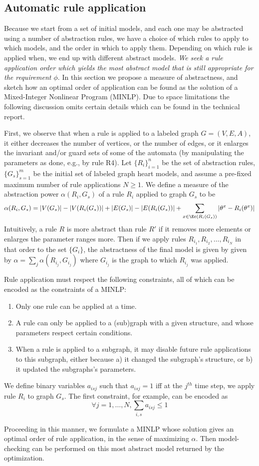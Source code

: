 \subsection{Automatic rule application}
\label{automatedApplication}

Because we start from a set of initial models, and each one may be abstracted using a number of abstraction rules, we have a choice of which rules to apply to which models, and the order in which to apply them.
Depending on which rule is applied when, we end up with different abstract models.
\emph{We seek a rule application order which yields the most abstract model that is still appropriate for the requirement $\phi$}.
In this section we propose a measure of abstractness, and sketch how an optimal order of application can be found as the solution of a Mixed-Integer Nonlinear Program (MINLP).
Due to space limitations the following discussion omits certain details which can be found in the technical report. 

First, we observe that when a rule is applied to a labeled graph $G=(V,E,A)$, it either decreases the number of vertices, or the number of edges, or it enlarges the invariant and/or guard sets of some of the automata (by manipulating the parameters as done, e.g., by rule R4).
Let $\{R_i\}_{i=1}^n$ be the set of abstraction rules, $\{G_s\}_{s=1}^m$ be the initial set of labeled graph heart models, and assume a pre-fixed maximum number of rule applications $N \geq 1$.
We define a measure of the abstraction power $\alpha(R_i,G_s)$ of a rule $R_i$ applied to graph $G_s$ to be
\[\alpha(R_i,G_s) = |V(G_s)| - |V(R_i(G_s))| + |E(G_s)| - |E(R_i(G_s))| + \sum_{x \in \Ec(R_i(G_s))}|\theta^x - R_i(\theta^x)|\] 
Intuitively, a rule $R$ is more abstract than rule $R'$ if it removes more elements or enlarges the parameter ranges more.
Then if we apply rules $R_{i_1}, R_{i_2},\ldots, R_{i_N}$ in that order to the set $\{G_i\}$, the abstractness of the final model is given by given by
$\alpha = \sum_j \alpha(R_{i_j},G_{i_j})$
where $G_{i_j}$ is the graph to which $R_{i_j}$ was applied.

Rule application must respect the following constraints, all of which can be encoded as the constraints of a MINLP:
\begin{enumerate}
	\item Only one rule can be applied at a time.
	\item A rule can only be applied to a (sub)graph with a given structure, and whose parameters respect certain conditions.
	\item When a rule is applied to a subgraph, it may disable future rule applications to this subgraph, either because a) it changed the subgraph's structure, or b) it updated the subgraphs's parameters.
\end{enumerate}
We define binary variables $a_{isj}$ such that $a_{isj} = 1$ iff at the $j^{th}$ time step, we apply rule $R_i$ to graph $G_s$.
The first constraint, for example, can be encoded as
\[\forall j=1,\ldots, N, \sum_{i,s}a_{isj} \leq 1\]

Proceeding in this manner, we formulate a MINLP whose solution gives an optimal order of rule application, in the sense of maximizing $\alpha$.
Then model-checking can be performed on this most abstract model returned by the optimization.